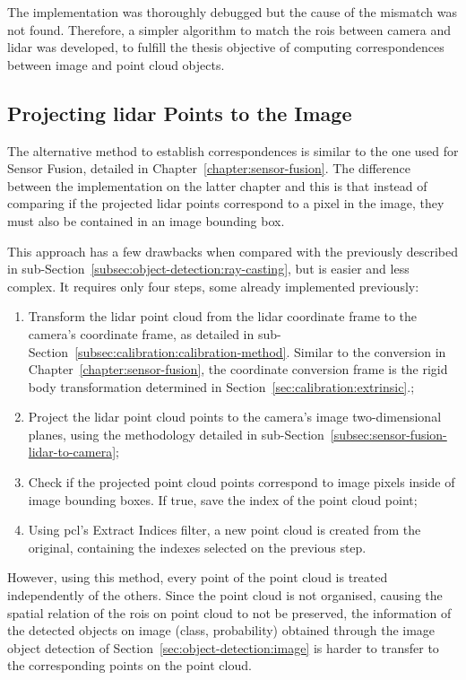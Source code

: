 The implementation was thoroughly debugged but the cause of the mismatch was not found. Therefore, a simpler algorithm to match the \acp{roi} between camera and \ac{lidar} was developed, to fulfill the thesis objective of computing correspondences between image and point cloud objects.


\subsection{Projecting \acs{lidar} Points to the Image}
\label{subsec:object-detection:projection-correspondences}

The alternative method to establish correspondences is similar to the one used for Sensor Fusion, detailed in Chapter~\ref{chapter:sensor-fusion}. The difference between the implementation on the latter chapter and this is that instead of comparing if the projected \ac{lidar} points correspond to a pixel in the image, they must also be contained in an image bounding box. 

This approach has a few drawbacks when compared with the previously described in sub-Section~\ref{subsec:object-detection:ray-casting}, but is easier and less complex. It requires only four steps, some already implemented previously:

\begin{enumerate}
	\item Transform the \ac{lidar} point cloud from the \ac{lidar} coordinate frame to the camera's coordinate frame, as detailed in sub-Section~\ref{subsec:calibration:calibration-method}. Similar to the conversion in Chapter~\ref{chapter:sensor-fusion}, the coordinate conversion frame is the rigid body transformation determined in Section~\ref{sec:calibration:extrinsic}.;
	\item Project the \ac{lidar} point cloud points to the camera's image two-dimensional planes, using the methodology detailed in sub-Section~\ref{subsec:sensor-fusion-lidar-to-camera};
	\item Check if the projected point cloud points correspond to image pixels inside of image bounding boxes. If true, save the index of the point cloud point;
	\item Using \ac{pcl}'s Extract Indices filter, a new point cloud is created from the original, containing the indexes selected on the previous step.
\end{enumerate}

However, using this method, every point of the point cloud is treated independently of the others. Since the point cloud is not organised, causing the spatial relation of the \acp{roi} on point cloud to not be preserved, the information of the detected objects on image (class, probability) obtained through the image object detection of Section~\ref{sec:object-detection:image} is harder to transfer to the corresponding points on the point cloud.


